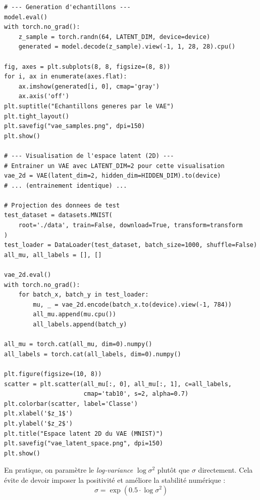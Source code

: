 \begin{codeblock}[title=\textbf{G\'en\'eration d'\'echantillons et visualisation de l'espace latent}]
\begin{verbatim}
# --- Generation d'echantillons ---
model.eval()
with torch.no_grad():
    z_sample = torch.randn(64, LATENT_DIM, device=device)
    generated = model.decode(z_sample).view(-1, 1, 28, 28).cpu()

fig, axes = plt.subplots(8, 8, figsize=(8, 8))
for i, ax in enumerate(axes.flat):
    ax.imshow(generated[i, 0], cmap='gray')
    ax.axis('off')
plt.suptitle("Echantillons generes par le VAE")
plt.tight_layout()
plt.savefig("vae_samples.png", dpi=150)
plt.show()

# --- Visualisation de l'espace latent (2D) ---
# Entrainer un VAE avec LATENT_DIM=2 pour cette visualisation
vae_2d = VAE(latent_dim=2, hidden_dim=HIDDEN_DIM).to(device)
# ... (entrainement identique) ...

# Projection des donnees de test
test_dataset = datasets.MNIST(
    root='./data', train=False, download=True, transform=transform
)
test_loader = DataLoader(test_dataset, batch_size=1000, shuffle=False)
all_mu, all_labels = [], []

vae_2d.eval()
with torch.no_grad():
    for batch_x, batch_y in test_loader:
        mu, _ = vae_2d.encode(batch_x.to(device).view(-1, 784))
        all_mu.append(mu.cpu())
        all_labels.append(batch_y)

all_mu = torch.cat(all_mu, dim=0).numpy()
all_labels = torch.cat(all_labels, dim=0).numpy()

plt.figure(figsize=(10, 8))
scatter = plt.scatter(all_mu[:, 0], all_mu[:, 1], c=all_labels,
                      cmap='tab10', s=2, alpha=0.7)
plt.colorbar(scatter, label='Classe')
plt.xlabel('$z_1$')
plt.ylabel('$z_2$')
plt.title("Espace latent 2D du VAE (MNIST)")
plt.savefig("vae_latent_space.png", dpi=150)
plt.show()
\end{verbatim}
\end{codeblock}

\begin{bonnepratique}
En pratique, on param\`etre le \emph{log-variance} $\log \sigma^2$ plut\^ot que $\sigma$ directement. Cela \'evite de devoir imposer la positivit\'e et am\'eliore la stabilit\'e num\'erique :
\begin{equation}
\sigma = \exp(0.5 \cdot \log \sigma^2)
\end{equation}
\end{bonnepratique}


